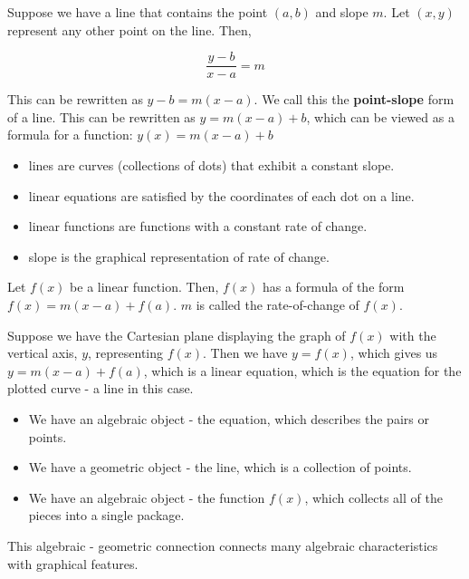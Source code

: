 \documentclass{ximera}
\begin{document}
Suppose we have a line that contains the point $(a,b)$ and slope $m$.  Let $(x,y)$ represent any other point on the line.  Then,



\[
\frac{y-b}{x-a} = m
\]

This can be rewritten as $y - b = m(x - a)$. We call this the \textbf{\textcolor{purple!85!blue}{point-slope}} form of a line.  This can be rewritten as $y = m(x - a) + b$, which can be viewed as a formula for a function: $y(x) = m(x - a) + b$ \\




\begin{itemize}
\item lines are curves (collections of dots) that exhibit a constant slope.
\item linear equations are satisfied by the coordinates of each dot on a line.
\item linear functions are functions with a constant rate of change.
\item slope is the graphical representation of rate of change.
\end{itemize}
















Let $f(x)$ be a linear function.  Then, $f(x)$ has a formula of the form $f(x) = m(x-a) + f(a)$.  $m$ is called the rate-of-change of $f(x)$.


Suppose we have the Cartesian plane displaying the graph of $f(x)$ with the vertical axis, $y$, representing $f(x)$.  Then we have $y = f(x)$, which gives us $y = m(x-a) + f(a)$, which is a linear equation, which is the equation for the plotted curve - a line in this case.

\begin{itemize}
\item We have an algebraic object - the equation, which describes the pairs or points. 
\item We have a geometric object - the line, which is a collection of points. 
\item We have an algebraic object - the function $f(x)$, which collects all of the pieces into a single package. 
\end{itemize}


This algebraic - geometric connection connects many algebraic characteristics with graphical features.
\end{document}
